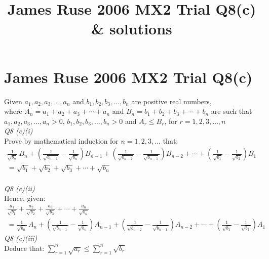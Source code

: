 \documentclass[11pt,a4paper]{article}
\title{James Ruse 2006 MX2 Trial Q8(c) & solutions}
\author{}
\date{}
\begin{document}
\section*{James Ruse 2006 MX2 Trial Q8(c)}
Given $a_1, a_2, a_3, \dots, a_n$ and $b_1, b_2, b_3, \dots, b_n$ are positive real numbers,\\
where $A_n = a_1 + a_2 + a_3 + \cdots + a_n$ and $B_n = b_1 + b_2 + b_3 + \cdots + b_n$ are such that\\
$a_1, a_2, a_3, \dots, a_n > 0$, $b_1, b_2, b_3, \dots, b_n > 0$ and $A_r \leq B_r$, for $r=1,2,3,\dots, n$\\[1em]
\textit{Q8 (c)(i)}\\[1em]
Prove by mathematical induction for $n=1,2,3, \dots$ that:
$$\begin{split}\frac{1}{\sqrt{b_n}}\,B_n+\left(\frac{1}{\sqrt{b_{n-1}}}-\frac{1}{\sqrt{b_n}}\right)B_{n-1}+\left(\frac{1}{\sqrt{b_{n-2}}}-\frac{1}{\sqrt{b_{n-1}}}\right)B_{n-2}
+ \cdots + \left(\frac{1}{\sqrt{b_{1}}}-\frac{1}{\sqrt{b_2}}\right)B_{1}\\
= \sqrt{b_1} + \sqrt{b_2} + \sqrt{b_3} + \cdots + \sqrt{b_n} \end{split} $$\\
\textit{Q8 (c)(ii)}\\[1em]
Hence, given:
$$\begin{split}
\frac{a_1}{\sqrt{b_1}}+\frac{a_2}{\sqrt{b_2}}+\frac{a_3}{\sqrt{b_3}}+\cdots+\frac{a_n}{\sqrt{b_n}}\\
=\frac{1}{\sqrt{b_n}}\,A_n+\left(\frac{1}{\sqrt{b_{n-1}}}-\frac{1}{\sqrt{b_n}}\right)A_{n-1}+\left(\frac{1}{\sqrt{b_{n-2}}}-\frac{1}{\sqrt{b_{n-1}}}\right)A_{n-2}
+ \cdots + \left(\frac{1}{\sqrt{b_{1}}}-\frac{1}{\sqrt{b_2}}\right)A_{1} \end{split}$$
\textit{Q8 (c)(iii)}\\[1em]
Deduce that: $\displaystyle\sum_{r=1}^{n}{\sqrt{a_r}} \leq \displaystyle\sum_{r=1}^{n}{\sqrt{b_r}}$
\end{document}
